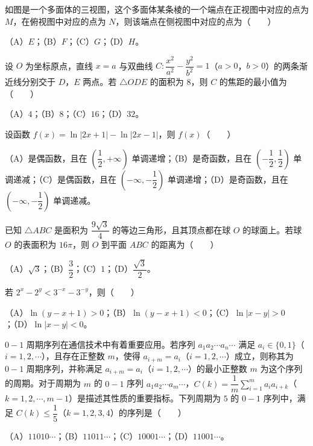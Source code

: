 \begin{question}
如图是一个多面体的三视图，这个多面体某条棱的一个端点在正视图中对应的点为 $M$，在俯视图中对应的点为 $N$，则该端点在侧视图中对应的点为\mbox{（　　）}

（A）$E$；（B）$F$；（C）$G$；（D）$H$。
\nopagebreak[4]
\begin{center}\end{center}
\nopagebreak[4]
\end{question}
\begin{question}
设 $O$ 为坐标原点，直线 $x=a$ 与双曲线 $C:\dfrac{x^2}{a^2}-\dfrac{y^2}{b^2}=1$（$a>0$，$b>0$）的两条渐近线分别交于 $D$，$E$ 两点。若 $\triangle ODE$ 的面积为 $8$，则 $C$ 的焦距的最小值为\mbox{（　　）}

（A）$4$；（B）$8$；（C）$16$；（D）$32$。

\end{question}
\begin{question}
设函数 $f(x)=\ln|2x+1|-\ln|2x-1|$，则 $f(x)$\mbox{（　　）}

（A）是偶函数，且在 $\left(\dfrac12,+\infty\right)$ 单调递增；（B）是奇函数，且在 $\left(-\dfrac12,\dfrac12\right)$ 单调递减；（C）是偶函数，且在 $\left(-\infty,-\dfrac12\right)$ 单调递增；（D）是奇函数，且在 $\left(-\infty,-\dfrac12\right)$ 单调递减。

\end{question}
\begin{question}
已知 $\triangle ABC$ 是面积为 $\dfrac{9\sqrt3}4$ 的等边三角形，且其顶点都在球 $O$ 的球面上。若球 $O$ 的表面积为 $16\pi$，则 $O$ 到平面 $ABC$ 的距离为\mbox{（　　）}

（A）$\sqrt3$；（B）$\dfrac32$；（C）$1$；（D）$\dfrac{\sqrt3}2$。

\end{question}
\begin{question}
若 $2^x-2^y<3^{-x}-3^{-y}$，则\mbox{（　　）}

（A）$\ln(y-x+1)>0$；（B）$\ln(y-x+1)<0$；（C）$\ln|x-y|>0$；（D）$\ln|x-y|<0$。

\end{question}
\begin{question}
$0-1$ 周期序列在通信技术中有着重要应用。若序列 $a_1a_2\cdots a_n\cdots$ 满足 $a_i\in\{0,1\}$（$i=1,2,\cdots$），且存在正整数 $m$，使得 $a_{i+m}=a_i$（$i=1,2,\cdots$）成立，则称其为 $0-1$ 周期序列，并称满足 $a_{i+m}=a_i$（$i=1,2,\cdots$）的最小正整数 $m$ 为这个序列的周期。对于周期为 $m$ 的 $0-1$ 序列 $a_1a_2\cdots a_m\cdots$，$C(k)=\dfrac1m\sum\limits_{i=1}^m a_ia_{i+k}$（$k=1,2,\cdots,m-1$）是描述其性质的重要指标。下列周期为 $5$ 的 $0-1$ 序列中，满足 $C(k)\leqslant\dfrac15$（$k=1,2,3,4$）的序列是\mbox{（　　）}

（A）$11010\cdots$；（B）$11011\cdots$；（C）$10001\cdots$；（D）$11001\cdots$。

\end{question}

